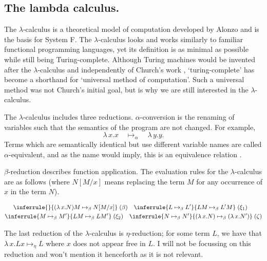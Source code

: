 \subsection{The lambda calculus.}
The $\lambda$-calculus is a theoretical model of computation developed by Alonzo
\citet{church_set_1932} and is the basis for System F. The $\lambda$-calculus looks and works
similarly to familiar functional programming languages, yet its definition is as minimal as possible
while still being Turing-complete. Although Turing machines would be invented after the
$\lambda$-calculus and independently of Church's work \citep{turing_computable_1937},
`turing-complete' has become a shorthand for `universal method of computation'. Such a universal
method was not Church's initial goal, but is why we are still interested in the $\lambda$-calculus.

The $\lambda$-calculus includes three reductions. $\alpha$-conversion is the renaming of variables
such that the semantics of the program are not changed. For example,
\begin{equation*}
  \lambda \, x. x \quad \mapsto_{\alpha} \quad \lambda \, y. y.
\end{equation*}
Terms which are semantically identical but use different variable names are called
$\alpha$-equivalent, and as the name would imply, this is an equivalence relation
\citep{pierce_types_2002}.

$\beta$-reduction describes function application. The evaluation rules for the $\lambda$-calculus
are as follows \citep{wadler_programming_2022} (where $N[M/x]$ means replacing the term $M$ for any
occurrence of $x$ in the term $N$).

\begin{equation}
\label{equation:untyped_beta_rules}
\begin{gathered}
  \inferrule{ }{(\lambda \, x. N)M \mapsto_{\beta} N[M/x]} \; (\beta) \quad
  \inferrule{L \mapsto_{\beta} L'}{LM \mapsto_{\beta} L'M} \; (\xi_1) \quad\\
  \inferrule{M \mapsto_{\beta} M'}{LM \mapsto_{\beta} LM'} \; (\xi_2) \quad
  \inferrule
    {N \mapsto_{\beta} N'}
    {(\lambda \, x. N) \mapsto_{\beta} (\lambda \, x. N')} \; (\zeta)
\end{gathered}
\end{equation}

The last reduction of the $\lambda$-calculus is $\eta$-reduction; for some term $L$, we have that
$\lambda \, x. L x \mapsto_{\eta} L$ where $x$ does not appear free in $L$. I will not be focussing
on this reduction and won't mention it henceforth as it is not relevant.

